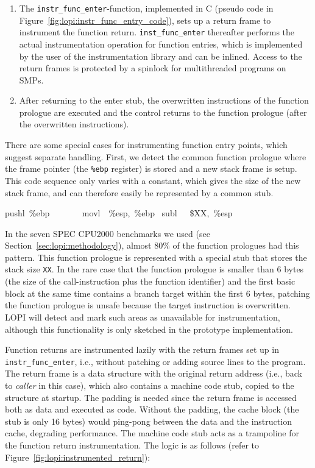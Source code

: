 \begin{enumerate}
\item The \texttt{instr\_func\_enter}-function, implemented in C (pseudo code
  in Figure~\ref{fig:lopi:instr_func_entry_code}), sets up a return frame to
  instrument the function return. \texttt{inst\_func\_enter} thereafter
  performs the actual instrumentation operation for function entries, which is
  implemented by the user of the instrumentation library and can be inlined.
  Access to the return frames is protected by a spinlock for multithreaded
  programs on SMPs.

\item After returning to the enter stub, the overwritten instructions of the
  function prologue are executed and the control returns to the function
  prologue (after the overwritten instructions).
\end{enumerate}

There are some special cases for instrumenting function entry points, which
suggest separate handling. First, we detect the common function prologue where
the frame pointer (the \texttt{\%ebp} register) is stored and a new stack
frame is setup. This code sequence only varies with a constant, which gives
the size of the new stack frame, and can therefore easily be represented by a
common stub.

\begin{pseudocode}
  pushl~\%ebp~~~~~~~
  movl~~\%esp,~\%ebp~
  subl~~~\$XX,~\%esp~
\end{pseudocode}

In the seven SPEC CPU2000 benchmarks we used (see
Section~\ref{sec:lopi:methodology}), almost 80\% of the function prologues had this
pattern. This function prologue is represented with a special stub that stores
the stack size \texttt{XX}.  In the rare case that the function prologue is
smaller than 6 bytes (the size of the call-instruction plus the function
identifier) and the first basic block at the same time contains a branch
target within the first 6 bytes, patching the function prologue is unsafe
because the target instruction is overwritten.  LOPI will detect and mark such
areas as unavailable for instrumentation, although this functionality is only
sketched in the prototype implementation.

Function returns are instrumented lazily with the return frames set up in
\texttt{instr\_func\_enter}, i.e., without patching or adding source lines to
the program. The return frame is a data structure with the original return
address (i.e., back to \emph{caller} in this case), which also contains a
machine code stub, copied to the structure at startup. The padding is needed
since the return frame is accessed both as data and executed as code. Without
the padding, the cache block (the stub is only 16 bytes) would ping-pong
between the data and the instruction cache, degrading performance.
The machine code stub acts as a trampoline for the function return
instrumentation. The logic is as follows (refer to
Figure~\ref{fig:lopi:instrumented_return}):

